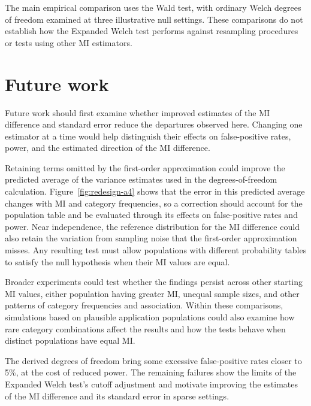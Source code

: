 The main empirical comparison uses the Wald test, with ordinary Welch
degrees of freedom examined at three illustrative null settings. These
comparisons do not establish how the Expanded Welch test performs against
resampling procedures or tests using other MI estimators.

\section{Future work}

Future work should first examine whether improved estimates of the MI
difference and standard error reduce the departures observed here.
Changing one estimator at a time would help distinguish their effects on
false-positive rates, power, and the estimated direction of the MI
difference.

Retaining terms omitted by the first-order approximation could improve the
predicted average of the variance estimates used in the degrees-of-freedom
calculation. Figure~\ref{fig:redesign-a4} shows that the error in this
predicted average changes with MI and category frequencies, so a correction
should account for the population table and be evaluated through its effects
on false-positive rates and power. Near independence, the reference
distribution for the MI difference could also retain the variation from
sampling noise that the first-order approximation misses. Any resulting
test must allow populations with different probability tables to satisfy
the null hypothesis when their MI values are equal.

Broader experiments could test whether the findings persist across other
starting MI values, either population having greater MI, unequal sample
sizes, and other patterns of category frequencies and association. Within
these comparisons, simulations based on plausible application populations
could also examine how rare category combinations affect the results and
how the tests behave when distinct populations have equal MI.

The derived degrees of freedom bring some excessive false-positive rates
closer to 5\%, at the cost of reduced power. The remaining failures show
the limits of the Expanded Welch test's cutoff adjustment and motivate improving
the estimates of the MI difference and its standard error in sparse
settings.

